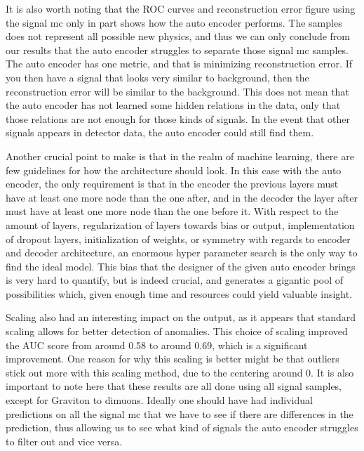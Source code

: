 \documentclass[ reprint, amsmath,amssymb, aps, nofootinbib]{revtex4-2}
\begin{document}
It is also worth noting that the ROC curves and reconstruction error figure using the signal mc only in part shows how the auto encoder performs. The samples does not represent all possible new physics, and thus we can only conclude from our results that the auto encoder struggles to separate those signal mc samples. The auto encoder has one metric, and that is minimizing reconstruction error. If you then have a signal that looks very similar to background, then the reconstruction error will be similar to the background. This does not mean that the auto encoder has not learned some hidden relations in the data, only that those relations are not enough for those kinds of signals. In the event that other signals appears in detector data, the auto encoder could still find them. \par \par

Another crucial point to make is that in the realm of machine learning, there are few guidelines for how the architecture should look. In this case with the auto encoder, the only requirement is that in the encoder the previous layers must have at least one more node than the one after, and in the decoder the layer after must have at least one more node than the one before it. With respect to the amount of layers, regularization of layers towards bias or output, implementation of dropout layers, initialization of weights, or symmetry with regards to encoder and decoder architecture, an enormous hyper parameter search is the only way to find the ideal model. This bias that the designer of the given auto encoder brings is very hard to quantify, but is indeed crucial, and generates a gigantic pool of possibilities which, given enough time and resources could yield valuable insight. \par \par

Scaling also had an interesting impact on the output, as it appears that standard scaling allows for better detection of anomalies. This choice of scaling improved the AUC score from around 0.58 to around 0.69, which is a significant improvement. One reason for why this scaling is better might be that outliers stick out more with this scaling method, due to the centering around 0. It is also important to note here that these results are all done using all signal samples, except for Graviton to dimuons. Ideally one should have had individual predictions on all the signal mc that we have to see if there are differences in the prediction, thus allowing us to see what kind of signals the auto encoder struggles to filter out and vice versa. \par \par
\end{document}
